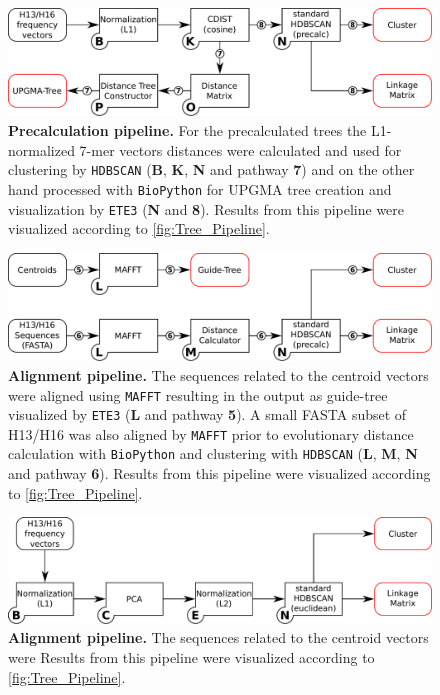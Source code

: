 \begin{figure}[!hbt]
    \centering
    \includegraphics[width=\textwidth]{Graphics/Precalculated.pdf}
    \caption[Precalculation pipeline]{\textbf{Precalculation pipeline.} For the precalculated trees the L1-normalized 7-mer vectors distances were calculated and used for clustering by \texttt{HDBSCAN} (\textsf{\textbf{B}}, \textsf{\textbf{K}}, \textsf{\textbf{N}} and pathway \textsf{\textbf{7}}) and on the other hand processed with \texttt{BioPython} for \gls{UPGMA} tree creation and visualization by \texttt{ETE3} (\textsf{\textbf{N}} and \textsf{\textbf{8}}). Results from this pipeline were visualized according to \autoref{fig:Tree_Pipeline}.}
    \label{fig:Precalc_Pipeline}
\end{figure}

\begin{figure}[!hbt]
    \centering
    \includegraphics[width=\textwidth]{Graphics/Alignment.pdf}
    \caption[Alignment pipeline]{\textbf{Alignment pipeline.} The sequences related to the centroid vectors were aligned using \texttt{MAFFT} resulting in the output as guide-tree visualized by \texttt{ETE3} (\textsf{\textbf{L}} and pathway \textsf{\textbf{5}}). A small FASTA subset of H13/H16 was also aligned by \texttt{MAFFT} prior to evolutionary distance calculation with \texttt{BioPython} and clustering with \texttt{HDBSCAN} (\textsf{\textbf{L}}, \textsf{\textbf{M}}, \textsf{\textbf{N}} and pathway \textsf{\textbf{6}}). Results from this pipeline were visualized according to \autoref{fig:Tree_Pipeline}.}
    \label{fig:Alignment_Pipeline}
\end{figure}

\begin{figure}[!hbt]
    \centering
    \includegraphics[width=\textwidth]{Graphics/Simple.pdf}
    \caption[Alignment pipeline]{\textbf{Alignment pipeline.} The sequences related to the centroid vectors were  Results from this pipeline were visualized according to \autoref{fig:Tree_Pipeline}.}
    \label{fig:Alignment_Pipeline}
\end{figure}

